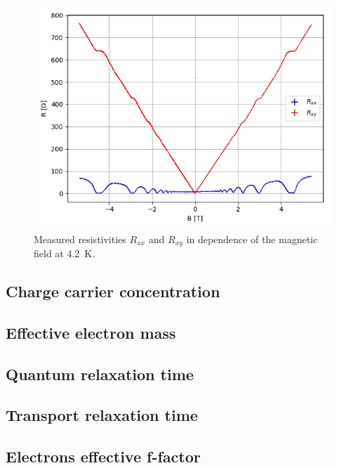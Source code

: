 \documentclass[12pt,a4paper]{article}
\begin{document}
\begin{figure} [H]
\centering
\includegraphics[scale=0.8]{Bilder/Elektron_g/4_2/Rohdaten.PNG}
\caption{Measured resistivities $R_{xx}$ and $R_{xy}$ in dependence of the magnetic field at \SI{4.2}{K}.}
\end{figure}

\newpage
\subsection*{Charge carrier concentration}

\newpage
\subsection*{Effective electron mass}

\newpage
\subsection*{Quantum relaxation time}

\newpage
\subsection*{Transport relaxation time}

\newpage
\subsection*{Electrons effective f-factor}
\end{document}
